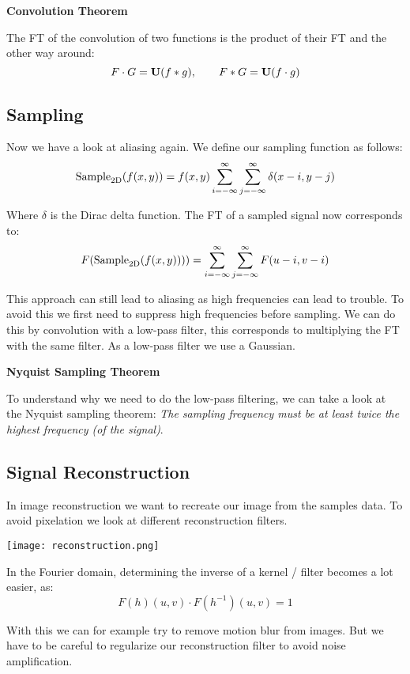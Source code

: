 \textbf{Convolution Theorem} \smallskip

The FT of the convolution of two functions is the product of their FT and the other way around:
$$F \cdot G = \textbf U (f * g), \qquad F * G = \textbf U (f \cdot g)$$


\subsection{Sampling}

Now we have a look at aliasing again. We define our sampling function as follows:
$$\text{Sample}_{2 \text D} (f(x,y)) = f(x,y) \sum_{i = - \infty}^\infty \sum_{j = - \infty}^\infty \delta (x-i, y-j)$$

Where $\delta$ is the Dirac delta function. The FT of a sampled signal now corresponds to:
$$F(\text{Sample}_{2 \text D} (f(x,y)))) = \sum_{i = - \infty}^\infty \sum_{j = - \infty}^\infty F(u-i, v-i)$$

This approach can still lead to aliasing as high frequencies can lead to trouble. To avoid this we first need to suppress high frequencies before sampling. We can do this by convolution with a low-pass filter, this corresponds to multiplying the FT with the same filter. As a low-pass filter we use a Gaussian. \medskip

\textbf{Nyquist Sampling Theorem} \smallskip

To understand why we need to do the low-pass filtering, we can take a look at the Nyquist sampling theorem: \textit{The sampling frequency must be at least twice the highest frequency (of the signal)}.


\subsection{Signal Reconstruction}

In image reconstruction we want to recreate our image from the samples data. To avoid pixelation we look at different reconstruction filters.
\begin{center}
	\texttt{[image: reconstruction.png]}
\end{center}

In the Fourier domain, determining the inverse of a kernel / filter becomes a lot easier, as:
$$F(h)(u,v) \cdot F(h^{-1})(u,v) = 1$$

With this we can for example try to remove motion blur from images. But we have to be careful to regularize our reconstruction filter to avoid noise amplification.
